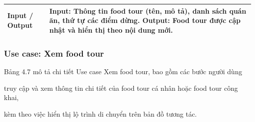 \begin{longtable}{|p{4cm}|p{10cm}|}
\textbf{Input / Output} &
Input: Thông tin food tour (tên, mô tả), danh sách quán ăn, thứ tự các điểm dừng. \newline Output: Food tour được cập nhật và hiển thị theo nội dung mới. \\
\hline

\end{longtable}
\endgroup



\subsubsection{Use case: Xem food tour}

Bảng 4.7 mô tả chi tiết Use case Xem food tour, bao gồm các bước người dùng

truy cập và xem thông tin chi tiết của food tour cá nhân hoặc food tour công khai,

kèm theo việc hiển thị lộ trình di chuyển trên bản đồ tương tác.


